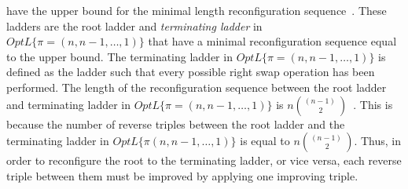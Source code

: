 have the upper bound for the minimal length reconfiguration sequence~\cite{A2}. These ladders are the root ladder and \emph{terminating ladder} in 
$OptL\{\pi=(n, n-1, \dots, 1)\}$ that have a minimal reconfiguration sequence equal to 
the upper bound. The terminating ladder in $OptL\{\pi=(n, n-1, \dots, 1)\}$ is defined as the ladder 
such that every possible right swap operation has been performed. The length of the reconfiguration sequence 
between the root ladder and terminating ladder in $OptL\{\pi=(n, n-1, \dots, 1)\}$ is $n{(n-1)~\choose 2}$~\cite{A2}. 
This is because the number of reverse triples between the root ladder and the terminating ladder 
in $OptL\{\pi(n, n-1, \dots, 1)\}$ is equal to $n{(n-1)~\choose 2}$. Thus, in 
order to reconfigure the root to the terminating ladder, or vice versa, each 
reverse triple between them must be improved by applying one improving triple.
